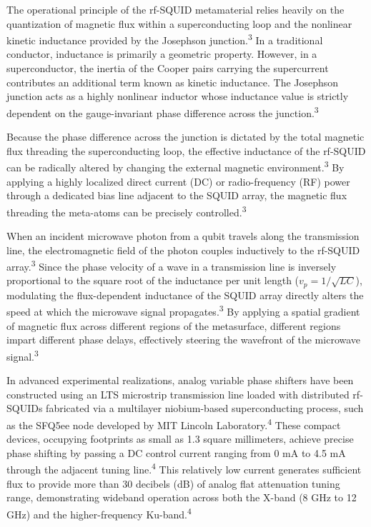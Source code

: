 \documentclass[11pt, a4paper]{article}
\begin{document}
The operational principle of the rf-SQUID metamaterial relies heavily on the quantization of magnetic flux within a superconducting loop and the nonlinear kinetic inductance provided by the Josephson junction.\textsuperscript{3} In a traditional conductor, inductance is primarily a geometric property. However, in a superconductor, the inertia of the Cooper pairs carrying the supercurrent contributes an additional term known as kinetic inductance. The Josephson junction acts as a highly nonlinear inductor whose inductance value is strictly dependent on the gauge-invariant phase difference across the junction.\textsuperscript{3}

Because the phase difference across the junction is dictated by the total magnetic flux threading the superconducting loop, the effective inductance of the rf-SQUID can be radically altered by changing the external magnetic environment.\textsuperscript{3} By applying a highly localized direct current (DC) or radio-frequency (RF) power through a dedicated bias line adjacent to the SQUID array, the magnetic flux threading the meta-atoms can be precisely controlled.\textsuperscript{3}

When an incident microwave photon from a qubit travels along the transmission line, the electromagnetic field of the photon couples inductively to the rf-SQUID array.\textsuperscript{3} Since the phase velocity of a wave in a transmission line is inversely proportional to the square root of the inductance per unit length ($v_p = 1/\sqrt{LC}$), modulating the flux-dependent inductance of the SQUID array directly alters the speed at which the microwave signal propagates.\textsuperscript{3} By applying a spatial gradient of magnetic flux across different regions of the metasurface, different regions impart different phase delays, effectively steering the wavefront of the microwave signal.\textsuperscript{3}

In advanced experimental realizations, analog variable phase shifters have been constructed using an LTS microstrip transmission line loaded with distributed rf-SQUIDs fabricated via a multilayer niobium-based superconducting process, such as the SFQ5ee node developed by MIT Lincoln Laboratory.\textsuperscript{4} These compact devices, occupying footprints as small as 1.3 square millimeters, achieve precise phase shifting by passing a DC control current ranging from 0 mA to 4.5 mA through the adjacent tuning line.\textsuperscript{4} This relatively low current generates sufficient flux to provide more than 30 decibels (dB) of analog flat attenuation tuning range, demonstrating wideband operation across both the X-band (8 GHz to 12 GHz) and the higher-frequency Ku-band.\textsuperscript{4}
\end{document}

